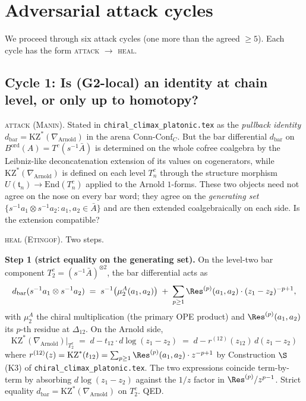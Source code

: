 \documentclass[12pt]{article}
\providecommand{\KZ}{\mathrm{KZ}}
\providecommand{\Arn}{\mathrm{Arnold}}
\providecommand{\dbar}{d_{\mathrm{bar}}}
\providecommand{\BarOrd}{B^{\mathrm{ord}}}
\providecommand{\ConnConf}{\mathrm{Conn\text{-}Conf}}
\theoremstyle{definition}
\begin{document}
\section{Adversarial attack cycles}
\label{sec:G2-attack-cycles}

We proceed through six attack cycles (one more than the agreed
$\geq 5$).  Each cycle has the form
\textsc{attack} $\to$ \textsc{heal}.

\subsection{Cycle 1: Is (G2-local) an identity at chain level, or
only up to homotopy?}
\label{ssec:cycle-1}

\textsc{attack (Manin).}
Stated in \texttt{chiral\_climax\_platonic.tex} as the
\emph{pullback identity}
$\dbar = \KZ^{*}(\nabla_{\Arn})$ in the arena $\ConnConf_{C}$.
But the bar differential $\dbar$ on $\BarOrd(A) = T^{c}(s^{-1}\bar A)$
is determined on the whole cofree coalgebra by the Leibniz-like
deconcatenation extension of its values on cogenerators, while
$\KZ^{*}(\nabla_{\Arn})$ is defined on each level $T^{c}_{n}$
through the structure morphism
$U(\mathfrak{t}_{n}) \to \mathrm{End}(T^{c}_{n})$
applied to the Arnold $1$\nobreakdash-forms.
These two objects need not agree on the nose on every bar word;
they agree on the \emph{generating set}
$\{s^{-1}a_1 \otimes s^{-1}a_2 : a_1, a_2 \in \bar A\}$
and are then extended coalgebraically on each side.
Is the extension compatible?

\textsc{heal (Etingof).}
Two steps.

\textbf{Step 1 (strict equality on the generating set).}
On the level-two bar component
$T^{c}_{2} = (s^{-1}\bar A)^{\otimes 2}$, the bar differential
acts as
\[
   \dbar(s^{-1}a_1 \otimes s^{-1}a_2)
   \;=\; s^{-1}\bigl(\mu_2^{A}(a_1, a_2)\bigr)
   \;+\; \sum_{p \geq 1}\Res^{(p)}(a_1,a_2)\cdot (z_1 - z_2)^{-p+1},
\]
with $\mu_2^{A}$ the chiral multiplication (the primary OPE product)
and $\Res^{(p)}(a_1, a_2)$ its $p$-th residue at
$\Delta_{12}$.  On the Arnold side,
\[
   \KZ^{*}(\nabla_{\Arn})|_{T^c_2}
   \;=\; d - t_{12}\cdot d\log(z_1 - z_2)
   \;=\; d - r^{(12)}(z_{12})\,d(z_1 - z_2)
\]
where $r^{(12)}(z) = \KZ^{*}(t_{12}) = \sum_{p \geq 1}\Res^{(p)}(a_1, a_2)\cdot z^{-p+1}$
by Construction
$\S$(K3) of \texttt{chiral\_climax\_platonic.tex}.  The two
expressions coincide term-by-term by absorbing $d\log(z_1 - z_2)$
against the $1/z$ factor in $\Res^{(p)}/z^{p-1}$.  Strict
equality $\dbar = \KZ^{*}(\nabla_{\Arn})$ on $T^c_2$.  QED.
\end{document}
